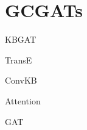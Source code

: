 \section{GCGATs}


KBGAT \cite{nathani2019learning}

TransE \cite{bordes2013translating}


ConvKB \cite{nguyen2017novel}

Attention \cite{vaswani2017attention}

GAT \cite{velivckovic2017graph}